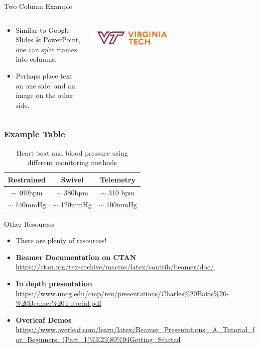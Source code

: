 \documentclass{beamer}
\begin{document}
\begin{frame}{Two Column Example}
\begin{columns}
\begin{column}{0.5\textwidth}

\begin{itemize}
    \item Similar to Google Slides \& PowerPoint, one can split frames into columns.
    \item Perhaps place text on one side, and an image on the other side.
\end{itemize}

\end{column}
\begin{column}{0.5\textwidth}

    \begin{center}
     \includegraphics[width=0.5\textwidth]{VTLogo.png}   
     \end{center}

\end{column}
\end{columns}
\end{frame}

\frame
{
	\frametitle{Example Table}
	
	\begin{table}
	\centering
	\begin{tabular}{|c|c|c|} \hline \hline
	Restrained     & Swivel         & Telemetry      \\ \hline \hline
	$\sim$ 400bpm  & $\sim$ 380bpm  & $\sim$ 310 bpm \\
	$\sim$ 140mmHg & $\sim$ 120mmHg & $\sim$ 100mmHg \\ \hline \hline
	\end{tabular}
	\caption{Heart beat and blood pressure using different monitoring methods}
	\label{tbl:kramer}
	\end{table}
}

\begin{frame}{Other Resources}
\begin{itemize}
    \item There are plenty of resources!
    \item \textbf{Beamer Documentation on CTAN} \\ \url{https://ctan.org/tex-archive/macros/latex/contrib/beamer/doc/}
    \item \textbf{In depth presentation} \\
    \url{https://www.uncg.edu/cmp/reu/presentations/Charles\%20Batts\%20-\%20Beamer\%20Tutorial.pdf}
    \item \textbf{Overleaf Demos} \\
    \url{https://www.overleaf.com/learn/latex/Beamer_Presentations:_A_Tutorial_for_Beginners_(Part_1)\%E2\%80\%94Getting_Started}
\end{itemize}
\end{frame}
\end{document}

